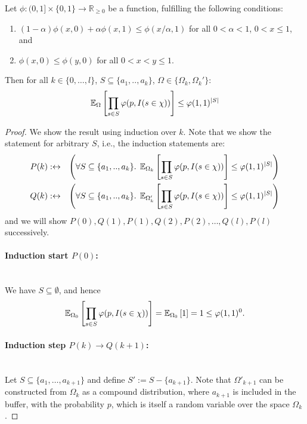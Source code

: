 \begin{lemma}
\label{le:prob_invariant}
Let $\phi : (0,1] \times \{0,1\} \rightarrow \mathbb R_{\geq 0}$ be a function, fulfilling the following
  conditions:
\begin{enumerate}
\item \label{cond:phi_1} $(1-\alpha) \phi(x,0) + \alpha \phi(x,1) \leq \phi(x/\alpha,1)$ for all
  $0 < \alpha < 1$, $0 < x \leq 1$, and
\item \label{cond:phi_2} $\phi(x,0) \leq \phi(y,0)$ for all $0 < x < y \leq 1$.
\end{enumerate}
Then for all
$k \in \{0,\ldots,l\}$, $S \subseteq \{a_1,..,a_k\}$, $\Omega \in \{\Omega_k,\Omega_k'\}$:
\[
  \operatorname{\mathbb E}_{\Omega}\left[ \prod_{s \in S} \varphi(p, I(s \in \chi)) \right] \leq \varphi(1,1)^{|S|}
\]
\end{lemma}
\begin{proof}
We show the result using induction over $k$. Note that we show the statement for arbitrary $S$,
i.e., the induction statements are:
\begin{eqnarray*}
P(k) & :\leftrightarrow & \left(\forall S \subseteq \{a_1,..,a_k\}. \;
  \operatorname{\mathbb E}_{\Omega_k}\left[ \prod_{s \in S} \varphi(p, I(s \in \chi)) \right]
    \leq \varphi(1,1)^{|S|} \right) \\
Q(k) & :\leftrightarrow & \left(\forall S \subseteq \{a_1,..,a_k\}. \;
  \operatorname{\mathbb E}_{\Omega'_k}\left[ \prod_{s \in S} \varphi(p, I(s \in \chi)) \right]
    \leq \varphi(1,1)^{|S|} \right)
\end{eqnarray*}
and we will show $P(0),Q(1),P(1),Q(2),P(2),\ldots,Q(l),P(l)$ successively.
\paragraph{Induction start $P(0)$:} \phantom{.}\\
We have $S \subseteq \emptyset$, and hence
\[
\operatorname{\mathbb E}_{\Omega_0}\left[ \prod_{s \in S} \varphi(p, I(s \in \chi)) \right] =
\operatorname{\mathbb E}_{\Omega_0}\left[1\right] = 1 \leq \varphi(1,1)^0 \textrm{.}
\]
\paragraph{Induction step $P(k) \rightarrow Q(k+1)$:} \phantom{.}\\
Let $S \subseteq \{ a_1, \ldots, a_{k+1} \}$ and define $S' := S - \{ a_{k+1} \}$.
Note that $\Omega'_{k+1}$ can be constructed from $\Omega_k$ as a compound distribution, where
$a_{k+1}$ is included in the buffer, with the probability $p$, which is itself a random variable
over the space $\Omega_k$.


\end{proof}
